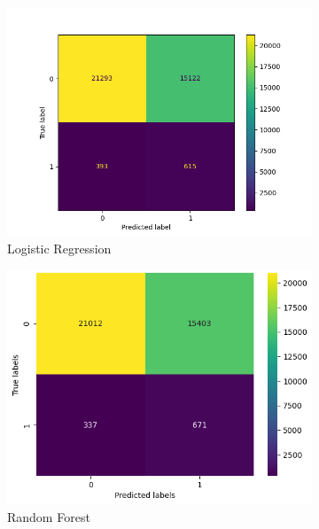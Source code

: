 \documentclass[a4paper,11pt]{report}
\begin{document}
\begin{figure}[h]
    \centering
    \begin{subfigure}[b]{0.52\textwidth}
        \includegraphics[width=\textwidth]{images/LG_S3_zero_CM.png}
        \caption{Logistic Regression}
        \label{fig:cm_lr}
    \end{subfigure}
    \hfill
    \begin{subfigure}[b]{0.44\textwidth}
        \includegraphics[width=\textwidth]{images/cm_rf.png}
        \caption{Random Forest}
        \label{fig:cm_rf}
    \end{subfigure}
    \hfill
    \begin{subfigure}[b]{0.52\textwidth}

\end{subfigure}
\end{figure}
\end{document}
